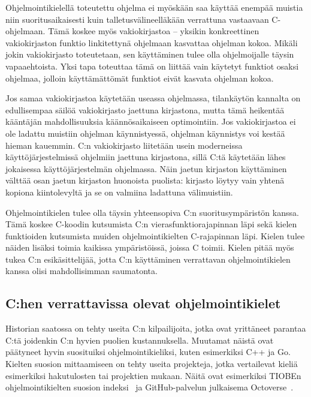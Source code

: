 Ohjelmointikielellä toteutettu ohjelma ei myöskään saa käyttää enempää muistia
niin suoritusaikaisesti kuin talletusvälineelläkään verrattuna vastaavaan
C-ohjelmaan. Tämä koskee myös vakiokirjastoa --
yksikin konkreettinen vakiokirjaston funktio linkitettynä ohjelmaan kasvattaa
ohjelman kokoa. Mikäli jokin vakiokirjasto toteutetaan, sen käyttäminen tulee
olla ohjelmoijalle täysin vapaaehtoista. Yksi tapa toteuttaa tämä on liittää
vain käytetyt funktiot osaksi ohjelmaa, jolloin käyttämättömät funktiot eivät
kasvata ohjelman kokoa.

Jos samaa vakiokirjastoa käytetään useassa ohjelmassa, tilankäytön kannalta on
edullisempaa säilöä vakiokirjasto jaettuna kirjastona, mutta tämä heikentää
kääntäjän mahdollisuuksia käännösaikaiseen optimointiin. Jos vakiokirjastoa ei
ole ladattu muistiin ohjelman käynnistyessä, ohjelman käynnistys voi kestää
hieman kauemmin. C:n vakiokirjasto liitetään usein moderneissa
käyttöjärjestelmissä ohjelmiin jaettuna kirjastona, sillä C:tä käytetään lähes
jokaisessa käyttöjärjestelmän ohjelmassa. Näin jaetun kirjaston käyttäminen
välttää osan jaetun kirjaston huonoista puolista: kirjasto löytyy vain yhtenä
kopiona kiintolevyltä ja se on valmiina ladattuna välimuistiin.

Ohjelmointikielen tulee olla täysin yhteensopiva C:n suoritusympäristön kanssa.
Tämä koskee C-koodin kutsumista C:n vierasfunktiorajapinnan
läpi sekä kielen funktioiden kutsumista
muiden ohjelmointikielten C-rajapinnan läpi. Kielen tulee näiden lisäksi toimia
kaikissa ympäristöissä, joissa C toimii. Kielen pitää myös tukea C:n
esikäsittelijää, jotta C:n käyttäminen verrattavan ohjelmointikielen kanssa
olisi mahdollisimman saumatonta.

\subsection{C:hen verrattavissa olevat ohjelmointikielet}

Historian saatossa on tehty useita C:n kilpailijoita, jotka ovat yrittäneet
parantaa C:tä joidenkin C:n hyvien puolien kustannuksella. Muutamat näistä ovat
päätyneet hyvin suosituiksi ohjelmointikieliksi, kuten esimerkiksi C++ ja Go.
Kielten suosion mittaamiseen on tehty useita projekteja, jotka vertailevat
kieliä esimerkiksi hakutulosten tai projektien mukaan. Näitä ovat esimerkiksi
TIOBEn ohjelmointikielten suosion indeksi~\citep{tiobe} ja GitHub-palvelun
julkaisema \mbox{Octoverse}~\citep{octoverse}.

